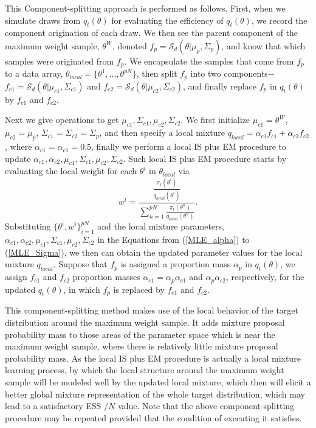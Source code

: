 \documentclass[aoas]{imsart}
\def\ESS{\textsf{ESS }}
\begin{document}
This Component-splitting approach is performed as follows. First,
when we simulate draws from $q_t(\theta)$ for evaluating the
efficiency of $q_t(\theta)$, we record the component origination of
each draw. We then see the parent component of the maximum weight
sample, $\theta^W$, denoted
$f_p=\mathcal{S}_d(\theta|\mu_p,\Sigma_p)$, and know that which
samples were originated from $f_p$. We encapsulate the samples that
come from $f_p$ to a data array,
$\mathcal{\theta}_{local}=\{\theta^{1},\ldots,\theta^{pN}\}$, then
split $f_p$ into two components$-$
$f_{c1}=\mathcal{S}_d(\theta|\mu_{c1},\Sigma_{c1})$ and
$f_{c2}=\mathcal{S}_d(\theta|\mu_{c2},\Sigma_{c2})$, and finally
replace $f_p$ in $q_t(\theta)$ by $f_{c1}$ and $f_{c2}$.

Next we give operations to get
$\mu_{c1},\Sigma_{c1},\mu_{c2},\Sigma_{c2}$. We first initialize
$\mu_{c1}=\theta^W$, $\mu_{c2}=\mu_p$,
$\Sigma_{c1}=\Sigma_{c2}=\Sigma_p$, and then specify a local mixture
$q_{local}=\alpha_{c1}f_{c1}+\alpha_{c2}f_{c2}$, where
$\alpha_{c1}=\alpha_{c1}=0.5$, finally we perform a local IS plus EM
procedure to update
$\alpha_{c1},\alpha_{c2},\mu_{c1},\Sigma_{c1},\mu_{c2},\Sigma_{c2}$.
Such local IS plus EM procedure starts by evaluating the local
weight for each $\theta^{i}$ in $\mathcal{\theta}_{local}$ via
\begin{equation}
w^i=\frac{\frac{\pi_{t}(\theta^{i})}{q_{local}(\theta^{i})}}{\sum_{n=1}^{pN}\frac{\pi_{t}(\theta^n)}{q_{local}(\theta^n)}}.
\end{equation}
Substituting $\{\theta^i,w^i\}_{i=1}^{pN}$ and the local mixture
parameters,
$\alpha_{c1},\alpha_{c2},\mu_{c1},\Sigma_{c1},\mu_{c2},\Sigma_{c2}$
in the Equations from (\ref{MLE_alpha}) to (\ref{MLE_Sigma}), we
then can obtain the updated parameter values for the local mixture
$q_{local}$. Suppose that $f_p$ is assigned a proportion mass
$\alpha_p$ in $q_t(\theta)$, we assign $f_{c1}$ and $f_{c2}$
proportion masses $\alpha_{c1}=\alpha_p\alpha_{c1}$ and
$\alpha_p\alpha_{c2}$, respectively, for the updated $q_t(\theta)$,
in which $f_p$ is replaced by $f_{c1}$ and $f_{c2}$.

This component-splitting method makes use of the local behavior of
the target distribution around the maximum weight sample. It adds
mixture proposal probability mass to those areas of the parameter
space which is near the maximum weight sample, where there is
relatively little mixture proposal probability mass. As the local IS
plus EM procedure is actually a local mixture learning process, by
which the local structure around the maximum weight sample will be
modeled well by the updated local mixture, which then will elicit a
better global mixture representation of the whole target
distribution, which may lead to a satisfactory \ESS$/N$ value. Note
that the above component-splitting procedure may be repeated
provided that the condition of executing it satisfies.
\end{document}
